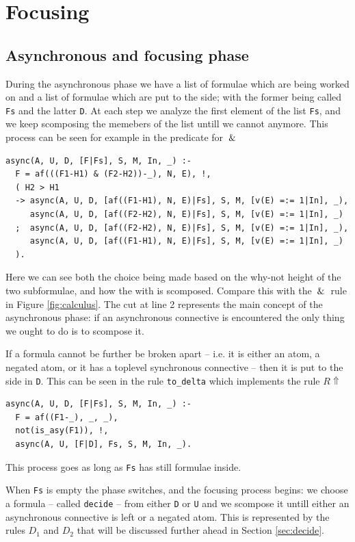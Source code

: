 \documentclass[a4paper, 12pt, english]{report}
\begin{document}
\section{Focusing}\label{sec:focusing_impl}
\subsection{Asynchronous and focusing phase}
During the asynchronous phase we have a list of formulae which are being worked on and a list of formulae which are put to the side; with the former being called \texttt{Fs} and the latter \texttt{D}.
At each step we analyze the first element of the list \texttt{Fs}, and we keep scomposing the memebers of the list untill we cannot anymore.
This process can be seen for example in the predicate for $\:\&\:$
\begin{verbatim}
async(A, U, D, [F|Fs], S, M, In, _) :-
  F = af(((F1-H1) & (F2-H2))-_), N, E), !,
  ( H2 > H1	
  -> async(A, U, D, [af((F1-H1), N, E)|Fs], S, M, [v(E) =:= 1|In], _), 
     async(A, U, D, [af((F2-H2), N, E)|Fs], S, M, [v(E) =:= 1|In], _) 
  ;  async(A, U, D, [af((F2-H2), N, E)|Fs], S, M, [v(E) =:= 1|In], _),
     async(A, U, D, [af((F1-H1), N, E)|Fs], S, M, [v(E) =:= 1|In], _)
  ).
\end{verbatim}
Here we can see both the choice being made based on the why-not height of the two subformulae, and how the with is scomposed.
Compare this with the $\:\&\:$ rule in Figure \ref{fig:calculus}.
The cut at line 2 represents the main concept of the asynchronous phase: if an asynchronous connective is encountered the only thing we ought to do is to scompose it.

If a formula cannot be further be broken apart -- i.e. it is either an atom, a negated atom, or it has a toplevel synchronous connective -- then it is put to the side in \texttt{D}.
This can be seen in the rule \texttt{to\_delta} which implements the rule $R\!\Uparrow$
\begin{verbatim}
async(A, U, D, [F|Fs], S, M, In, _) :-
  F = af((F1-_), _, _),
  not(is_asy(F1)), !,
  async(A, U, [F|D], Fs, S, M, In, _).
\end{verbatim}
This process goes as long as \texttt{Fs} has still formulae inside.

When \texttt{Fs} is empty the phase switches, and the focusing process begins: we choose a formula -- called \texttt{decide} -- from either \texttt{D} or \texttt{U} and we scompose it untill either an asynchronous connective is left or a negated atom.
This is represented by the rules $D_1$ and $D_2$ that will be discussed further ahead in Section \ref{sec:decide}.
\end{document}

